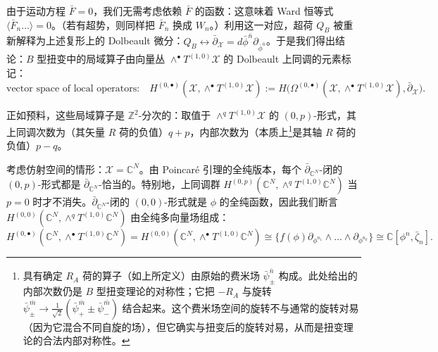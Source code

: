 由于运动方程 $\bar F=0$，我们无需考虑依赖 $\bar F$ 的函数：这意味着 Ward 恒等式 $\langle\bar F_n\dots\rangle=0$。（若有超势，则同样把 $\bar F_n$ 换成 $W_n$。）利用这一对应，超荷 $Q_B$ 被重新解释为上述复形上的 Dolbeault 微分：$Q_B\leftrightarrow\bar\partial_{\mathcal{X}}=d\bar\phi^{\bar n}\partial_{\bar\phi^{\bar n}}$。于是我们得出结论：$B$ 型扭变中的局域算子由向量丛 $\wedge^\bullet T^{(1,0)}\mathcal{X}$ 的 Dolbeault 上同调的元素标记：
\begin{equation}\tag{2.32}
\text{vector space of local operators:}\quad H^{(0,\bullet)}(\mathcal{X},\wedge^\bullet T^{(1,0)}\mathcal{X}):=H\big(\Omega^{(0,\bullet)}(\mathcal{X},\wedge^\bullet T^{(1,0)}\mathcal{X}),\bar\partial_{\mathcal{X}}\big).
\end{equation}

正如预料，这些局域算子是 $\mathbb{Z}^2$-分次的：取值于 $\wedge^qT^{(1,0)}\mathcal{X}$ 的 $(0,p)$-形式，其上同调次数为（其矢量 $R$ 荷的负值）$q+p$，内部次数为（本质上\footnote{具有确定 $R_A$ 荷的算子（如上所定义）由原始的费米场 $\bar\psi^{\bar n}_\pm$ 构成。此处给出的内部次数仍是 $B$ 型扭变理论的对称性；它把 $-R_A$ 与旋转 $\bar\psi^{\bar m}_\pm\to\frac{1}{\sqrt2}(\bar\psi^{\bar m}_+\pm\bar\psi^{\bar m}_-)$ 结合起来。这个费米场空间的旋转不与通常的旋转对易（因为它混合不同自旋的场），但它确实与扭变后的旋转对易，从而是扭变理论的合法内部对称性。}是其轴 $R$ 荷的负值）$p-q$。

考虑仿射空间的情形：$\mathcal{X}=\mathbb{C}^N$。由 Poincaré 引理的全纯版本，每个 $\bar\partial_{\mathbb{C}^N}$-闭的 $(0,p)$-形式都是 $\bar\partial_{\mathbb{C}^N}$-恰当的。特别地，上同调群 $H^{(0,p)}(\mathbb{C}^N,\wedge^qT^{(1,0)}\mathbb{C}^N)$ 当 $p=0$ 时才不消失。$\bar\partial_{\mathbb{C}^N}$-闭的 $(0,0)$-形式就是 $\phi$ 的全纯函数，因此我们断言 $H^{(0,0)}(\mathbb{C}^N,\wedge^qT^{(1,0)}\mathbb{C}^N)$ 由全纯多向量场组成：
\begin{equation}\tag{2.33}
H^{(0,\bullet)}(\mathbb{C}^N,\wedge^\bullet T^{(1,0)}\mathbb{C}^N)=H^{(0,0)}(\mathbb{C}^N,\wedge^\bullet T^{(1,0)}\mathbb{C}^N)\cong\big\{f(\phi)\partial_{\phi^{n_1}}\wedge\dots\wedge\partial_{\phi^{n_k}}\big\}\cong\mathbb{C}[\phi^n,\bar\zeta_n].
\end{equation}

